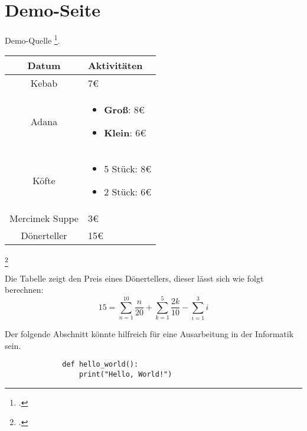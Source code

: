 \section{Demo-Seite}
Demo-Quelle \footcite[Vgl.][]{DemoQuelle}.

\begin{center}
    \begin{table}[h]
    \centering
    \begin{tabular}{|c|p{6cm}|}
        \hline
        \textbf{Datum} & \textbf{Aktivitäten} \\
        \hline
        Kebab & 7€ \\
        \hline
        Adana & \begin{itemize}
            \item \textbf{Groß}: 8€
            \item \textbf{Klein}: 6€
        \end{itemize} \\
        \hline
        Köfte & \begin{itemize}
            \item 5 Stück: 8€
            \item 2 Stück: 6€
        \end{itemize}\\
        \hline
        Mercimek Suppe & 3€ \\
        \hline
        Dönerteller & 15€ \\
        \hline
    \end{tabular}
    \label{tab:example}
    \end{table}
\end{center}
\footcitetext[Vgl.][]{DemoQuelle}

Die Tabelle zeigt den Preis eines Dönertellers, dieser lässt sich wie folgt berechnen:
\begin{equation}
    15 = \sum_{n=1}^{10} \frac{n}{20} + \sum_{k=1}^{5} \frac{2k}{10} - \sum_{i=1}^{3} i
\end{equation}

\newpage
Der folgende Abschnitt könnte hilfreich für eine Ausarbeitung in der Informatik sein.
\begin{figure}[h]
    \begin{lstlisting}
        def hello_world():
            print("Hello, World!")
    \end{lstlisting}
    \label{fig:meincode}
\end{figure}
